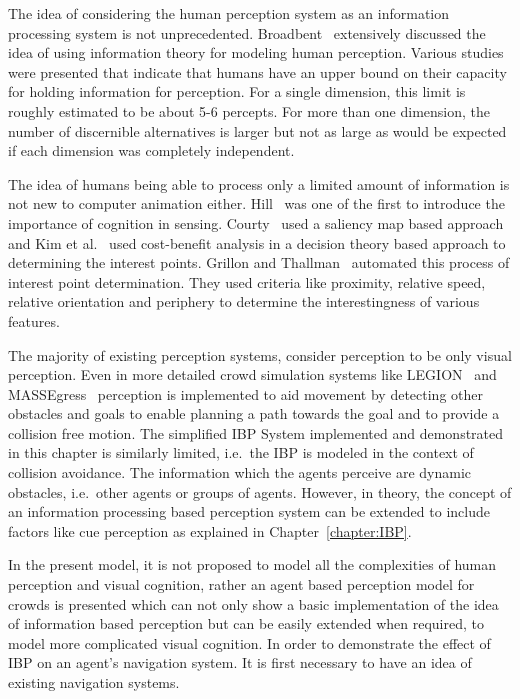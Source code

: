The idea of considering the human perception system as an information processing system is not unprecedented. Broadbent~\cite{Broadbent:1965is} extensively discussed the idea of using information theory for modeling human perception. Various studies were presented that indicate that humans have an upper bound on their capacity for holding information for perception. For a single dimension, this limit is roughly estimated to be about 5-6 percepts. For more than one dimension, the number of discernible alternatives is larger but not as large as would be expected if each dimension was completely independent.

The idea of humans being able to process only a limited amount of information is not new to computer animation either. Hill~\cite{Hill:1999ww} was one of the first to introduce the importance of cognition in sensing. Courty~\cite{Courty:2003hy} used a saliency map based approach and Kim et al.~\cite{Kim:2005ub} used cost-benefit analysis in a decision theory based approach to determining the interest points. Grillon and Thallman~\cite{Grillon:2009hf} automated this process of interest point determination. They used criteria like proximity, relative speed, relative orientation and periphery to determine the interestingness of various features.

The majority of existing perception systems, consider perception to be only visual perception. Even in more detailed crowd simulation systems like LEGION~\cite{Still:2000tp} and MASSEgress~\cite{Pan:2006vp} perception is implemented to aid movement by detecting other obstacles and goals to enable planning a path towards the goal and to provide a collision free motion. The simplified IBP System implemented and demonstrated in this chapter is similarly limited, i.e.\ the IBP is modeled in the context of collision avoidance. The information which the agents perceive are dynamic obstacles, i.e.\ other agents or groups of agents. However, in theory, the concept of an information processing based perception system can be extended to include factors like cue perception as explained in Chapter~\ref{chapter:IBP}.

In the present model, it is not proposed to model all the complexities of human perception and visual cognition, rather an agent based perception model for crowds is presented which can not only show a basic implementation of the idea of information based perception but can be easily extended when required, to model more complicated visual cognition. In order to demonstrate the effect of IBP on an agent's navigation system. It is first necessary to have an idea of existing navigation systems.

